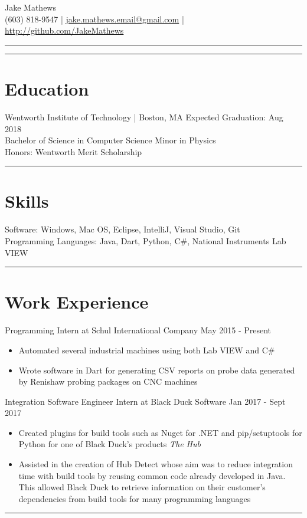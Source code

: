 \documentclass{article}
\begin{document}
\begin{center}
\huge Jake Mathews \\
\vspace{5px}
\large (603) 818-9547 | \href{mailto:jake.mathews.email@gmail.com}{jake.mathews.email@gmail.com} | \url{http://github.com/JakeMathews}
\end{center}
\hrule
\vspace{1pt}
\hrule height 1pt

\section*{Education}
\large
Wentworth Institute of Technology | Boston, MA \hfill Expected Graduation: Aug 2018 \\
Bachelor of Science in Computer Science \hfill Minor in Physics \\
Honors: Wentworth Merit Scholarship \\
\hrule

\section*{Skills}
Software: Windows, Mac OS, Eclipse, IntelliJ, Visual Studio, Git \\
Programming Languages: Java, Dart, Python, C\#, National Instruments Lab VIEW \\
\hrule

\section*{Work Experience}
Programming Intern at Schul International Company  \hfill May 2015 - Present
\begin{itemize} 
	\item Automated several industrial machines using both Lab VIEW and C\#
	\item Wrote software in Dart for generating CSV reports on probe data generated by Renishaw probing packages on CNC machines
\end{itemize}

\noindent
Integration Software Engineer Intern at Black Duck Software \hfill Jan 2017 - Sept 2017 
\begin{itemize}
	\item Created plugins for build tools such as Nuget for .NET and pip/setuptools for Python for one of Black Duck's products \textit{The Hub}
	\item Assisted in the creation of Hub Detect whose aim was to reduce integration time with build tools by reusing common code already developed in Java. This allowed Black Duck to retrieve information on their customer's dependencies from build tools for many programming languages \\
\end{itemize}
\hrule
\end{document}
